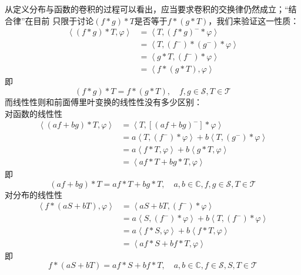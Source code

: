 从定义分布与函数的卷积的过程可以看出，应当要求卷积的交换律仍然成立；“结合律”在目前
只限于讨论$(f*g)*T$是否等于$f*(g*T)$，我们来验证这一性质：
\begin{align*}
    \left\langle (f*g)*T,\varphi\right\rangle & =\left\langle T,(f*g)^- *\varphi\right\rangle\\
    & =\left\langle T,(f^-)*(g^-)*\varphi\right\rangle\\
    & =\left\langle g*T,(f^-)*\varphi\right\rangle\\
    & =\left\langle f*(g*T),\varphi\right\rangle
\end{align*}
即\[(f*g)*T=f*(g*T),\quad f,g\in\mathcal{S} ,T\in\mathcal{T}\]
而线性性则和前面傅里叶变换的线性性没有多少区别：\\
对函数的线性性
\begin{align*}
    \left\langle (af+bg)*T,\varphi\right\rangle & =\left\langle T,[(af+bg)^-]*\varphi\right\rangle                                               \\
                                     & =a\left\langle T,(f^-)*\varphi\right\rangle+b\left\langle T,(g^-)*\varphi\right\rangle                    \\
                                     & =a\left\langle f*T,\varphi\right\rangle+b\left\langle g*T,\varphi\right\rangle                            \\
                                     & =\left\langle af*T+bg*T,\varphi\right\rangle
\end{align*}
即\[(af+bg)*T=af*T+bg*T,\quad a,b\in\mathbb{C},f,g\in\mathcal{S} ,T\in\mathcal{T} \]
{\parskip=0pt  对分布的线性性}
\begin{align*}
    \left\langle f*(aS+bT),\varphi\right\rangle & =\left\langle aS+bT,(f^-)*\varphi\right\rangle                                                 \\
                                     & =a\left\langle S,(f^-)*\varphi\right\rangle+b\left\langle T,(f^-)*\varphi\right\rangle                    \\
                                     & =a\left\langle f*S,\varphi\right\rangle+b\left\langle f*T,\varphi\right\rangle                            \\
                                     & =\left\langle af*S+bf*T,\varphi\right\rangle
\end{align*}
即\[f*(aS+bT)=af*S+bf*T,\quad a,b\in\mathbb{C},f\in\mathcal{S} ,S,T\in\mathcal{T}\]

